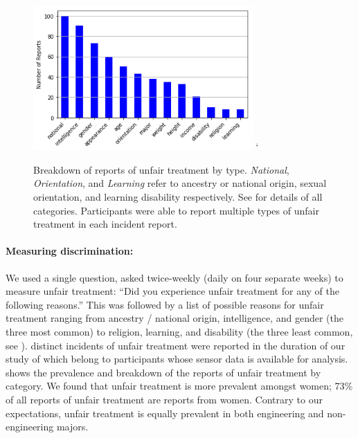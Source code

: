 \begin{figure}
\vspace{-.5cm}
    \centering
    \includegraphics[width=3.3in]{img/discrimination_breakdown.png}
`    \caption[Unfair treatment type breakdown]{Breakdown of \numdiscriminationeventsfinal reports of unfair treatment by type. \textit{National}, \textit{Orientation}, and \textit{Learning} refer to ancestry or national origin, sexual orientation, and learning disability respectively. See  for details of all categories. Participants were able to report multiple types of unfair treatment in each incident report.
}
    \label{fig:data-discrimination-breakdown}
\end{figure}

\paragraph{Measuring discrimination:} We used a single question, asked twice-weekly (daily on four separate weeks) to measure unfair treatment: ``Did you experience unfair treatment for any of the following reasons.'' This was followed by a list of possible reasons for unfair treatment ranging from ancestry / national origin, intelligence, and gender (the three most common) to religion, learning, and disability (the three least common, see ). \numdiscriminationevents distinct incidents of unfair treatment were reported in the duration of our study of which \numdiscriminationeventsfinal belong to participants whose sensor data is available for analysis.  shows the prevalence and breakdown of the reports of unfair treatment by category. We found that unfair treatment is more prevalent amongst women; 73\% of all reports of unfair treatment are reports from women. Contrary to our expectations, unfair treatment is equally prevalent in both engineering and non-engineering majors. 


